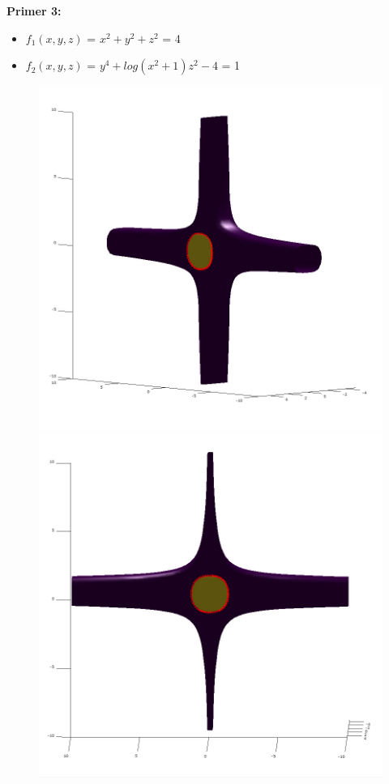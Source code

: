 \documentclass[12pt]{article}
\begin{document}
		\begin{minipage}{\textwidth}
	\textbf{\large{Primer 3:}}
	\begin{itemize}  
		\item $f_{1}(x,y,z)$ = $x^2 + y^2 + z^2$ = 4
		\item $f_{2}(x,y,z)$ = $y^4 + log(x^2 + 1)z^2 - 4$ = 1
	\end{itemize}
	\begin{figure}[H]
	    \centering
	    \includegraphics[scale=0.3]{primer3_1}
    	\includegraphics[scale=0.3]{primer3_2}
	\end{figure}
	\end{minipage}
	
\end{document}
